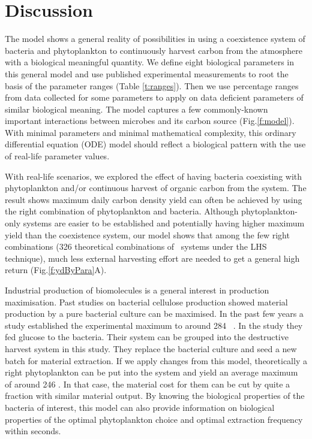 \documentclass[../thesis.tex]{subfiles} %
\begin{document}
\section{Discussion}
The model shows a general reality of possibilities in using a coexistence system of bacteria and phytoplankton to continuously harvest carbon from the atmosphere with a biological meaningful quantity.  We define eight biological parameters in this general model and use published experimental measurements to root the basis of the parameter ranges (Table \ref{t:ranges}).  Then we use percentage ranges from data collected for some parameters to apply on data deficient parameters of similar biological meaning.  The model captures a few commonly-known important interactions between microbes and its carbon source (Fig.\ref{f:model}).  With minimal parameters and minimal mathematical complexity, this ordinary differential equation (ODE) model should reflect a biological pattern with the use of real-life parameter values.

With real-life scenarios, we explored the effect of having bacteria coexisting with phytoplankton and/or continuous harvest of organic carbon from the system.  The result shows maximum daily carbon density yield can often be achieved by using the right combination of phytoplankton and bacteria.  Although phytoplankton-only systems are easier to be established and potentially having higher maximum yield than the coexistence system, our model shows that among the few right combinations (326 theoretical combinations of \PBH\ systems under the LHS technique), much less external harvesting effort are needed to get a general high return (Fig.\ref{f:ydByPara}A).

Industrial production of biomolecules is a general interest in production maximisation.  Past studies on bacterial cellulose production showed material production by a pure bacterial culture can be maximised.  In the past few years a study established the experimental maximum to around 284 \dxdt\ \autocite{aytekin2016statistical}.  In the study they fed glucose to the bacteria.  Their system can be grouped into the destructive harvest system in this study.  They replace the bacterial culture and seed a new batch for material extraction.  If we apply changes from this model, theoretically a right phytoplankton can be put into the system and yield an average maximum of around 246 \dxdt.  In that case, the material cost for them can be cut by quite a fraction with similar material output.  By knowing the biological properties of the bacteria of interest, this model can also provide information on biological properties of the optimal phytoplankton choice and optimal extraction frequency within seconds.
\end{document}
